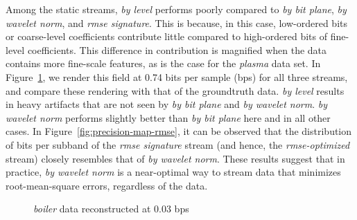 Among the static streams, \emph{by level} performs poorly compared to \emph{by bit plane}, \emph{by
wavelet norm}, and \emph{rmse signature}. This is because, in this case, low-ordered bits or
coarse-level coefficients contribute little compared to high-ordered bits of fine-level
coefficients. This difference in contribution is magnified when the data contains more fine-scale
features, as is the case for the \emph{plasma} data set. In Figure~\ref{fig:rmse-rendering}, we
render this field at 0.74 bits per sample (bps) for all three streams, and compare these rendering
with that of the groundtruth data. \emph{by level} results in heavy artifacts that are not seen by
\emph{by bit plane} and \emph{by wavelet norm}. \emph{by wavelet norm} performs slightly better than
\emph{by bit plane} here and in all other cases. In Figure~\ref{fig:precision-map-rmse}, it can be
observed that the distribution of bits per subband of the \emph{rmse signature} stream (and hence,
the \emph{rmse-optimized} stream) closely resembles that of \emph{by wavelet norm}. These results
suggest that in practice, \emph{by wavelet norm} is a near-optimal way to stream data that minimizes
root-mean-square errors, regardless of the data.

\begin{figure}[h]
	\centering
	\caption{\emph{boiler} data reconstructed at 0.03 bps}
 	\label{fig:rmse-rendering}
\end{figure}
